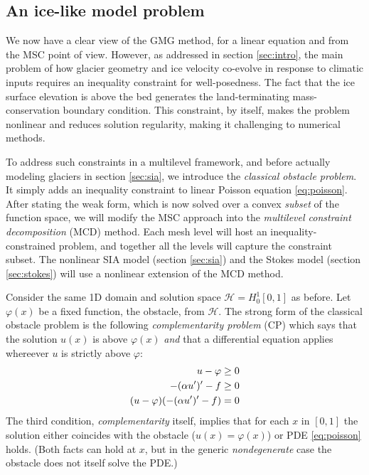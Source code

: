 \documentclass[letterpaper,final,12pt,reqno]{amsart}
\theoremstyle{claim}
\numberwithin{equation}{section}
\numberwithin{figure}{section}
\numberwithin{table}{section}
\numberwithin{theorem}{section}
\begin{document}
\subsection*{An ice-like model problem}  We now have a clear view of the GMG method, for a linear equation and from the MSC point of view.  However, as addressed in section \ref{sec:intro}, the main problem of how glacier geometry and ice velocity co-evolve in response to climatic inputs requires an inequality constraint for well-posedness.  The fact that the ice surface elevation is above the bed generates the land-terminating mass-conservation boundary condition.  This constraint, by itself, makes the problem nonlinear and reduces solution regularity, making it challenging to numerical methods.

To address such constraints in a multilevel framework, and before actually modeling glaciers in section \ref{sec:sia}, we introduce the \emph{classical obstacle problem}.  It simply adds an inequality constraint to linear Poisson equation \eqref{eq:poisson}.  After stating the weak form, which is now solved over a convex \emph{subset} of the function space, we will modify the MSC approach into the \emph{multilevel constraint decomposition} (MCD) method.  Each mesh level will host an inequality-constrained problem, and together all the levels will capture the constraint subset.  The nonlinear SIA model (section \ref{sec:sia}) and the Stokes model (section \ref{sec:stokes}) will use a nonlinear extension of the MCD method.

Consider the same 1D domain and solution space $\mathcal{H}=H_0^1[0,1]$ as before.  Let $\varphi(x)$ be a fixed function, the obstacle, from $\mathcal{H}$.  The strong form of the classical obstacle problem is the following \emph{complementarity problem} (CP) \cite{Bueler2021,KinderlehrerStampacchia1980} which says that the solution $u(x)$ is above $\varphi(x)$ \emph{and} that a differential equation applies whereever $u$ is strictly above $\varphi$:
\begin{align}
  u - \varphi &\ge 0 \label{eq:obstaclecp} \\
  -(\alpha u')'-f &\ge 0 \notag \\
  (u-\varphi)(-(\alpha u')'-f) &= 0 \notag
\end{align}
The third condition, \emph{complementarity} itself, implies that for each $x$ in $[0,1]$ the solution either coincides with the obstacle ($u(x)=\varphi(x)$) or PDE \eqref{eq:poisson} holds.  (Both facts can hold at $x$, but in the generic \emph{nondegenerate} \cite{KinderlehrerStampacchia1980} case the obstacle does not itself solve the PDE.)
\end{document}
